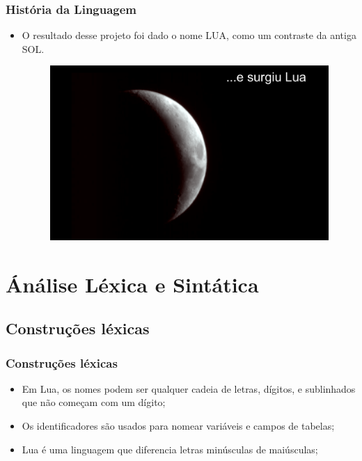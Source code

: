 \documentclass{beamer}
\begin{document}
\begin{frame}[fragile]
\frametitle{História da Linguagem}
	\begin{itemize}
		\item O resultado desse projeto foi dado o nome LUA, como um contraste da antiga SOL.
		\begin{figure}[H]
			\centering
			\includegraphics[width=1\linewidth]{imagens/lua}
		\end{figure}
	\end{itemize}
\end{frame}

\section{Ánálise Léxica e Sintática}
\subsection{Construções léxicas}
\begin{frame}[fragile]
\frametitle{Construções léxicas}
	\begin{itemize}
	\item<1-> Em Lua, os nomes podem ser qualquer cadeia de letras, dígitos, e sublinhados que não começam com um dígito; 
	\item<2-> Os identificadores são usados para nomear variáveis e campos de tabelas;
	\item<3-> Lua é uma linguagem que diferencia letras minúsculas de maiúsculas;
	\end{itemize}
\end{frame}
\end{document}
